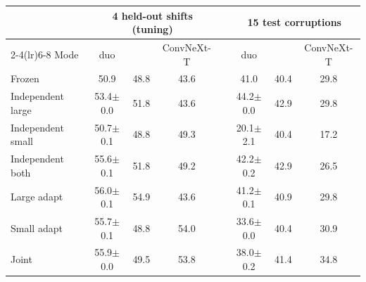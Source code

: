 \begin{tabular}{@{}l ccc c ccc@{}}
\toprule
 & \multicolumn{3}{c}{4 held-out shifts (tuning)} & & \multicolumn{3}{c}{15 test corruptions} \\
\cmidrule(lr){2-4}\cmidrule(lr){6-8}
Mode & duo & \vit{} & ConvNeXt-T & & duo & \vit{} & ConvNeXt-T \\
\midrule
Frozen & 50.9 & 48.8 & 43.6 & & 41.0 & 40.4 & 29.8 \\
\midrule
Independent large & 53.4$\pm$0.0 & 51.8 & 43.6 & & 44.2$\pm$0.0 & 42.9 & 29.8 \\
Independent small & 50.7$\pm$0.1 & 48.8 & 49.3 & & 20.1$\pm$2.1 & 40.4 & 17.2 \\
Independent both & 55.6$\pm$0.1 & 51.8 & 49.2 & & 42.2$\pm$0.2 & 42.9 & 26.5 \\
\midrule
Large adapt & 56.0$\pm$0.1 & 54.9 & 43.6 & & 41.2$\pm$0.1 & 40.9 & 29.8 \\
Small adapt & 55.7$\pm$0.1 & 48.8 & 54.0 & & 33.6$\pm$0.0 & 40.4 & 30.9 \\
\midrule
Joint & 55.9$\pm$0.0 & 49.5 & 53.8 & & 38.0$\pm$0.2 & 41.4 & 34.8 \\
\bottomrule
\end{tabular}
